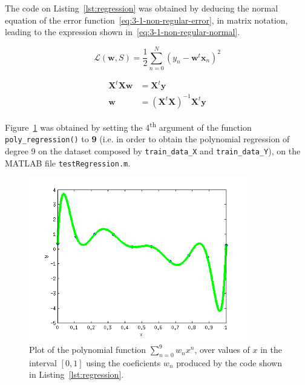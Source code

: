 \documentclass[paper=a4, fontsize=11pt]{scrartcl} %
\numberwithin{equation}{section} %
\numberwithin{figure}{section} %
\numberwithin{table}{section} %
\newcommand{\vertbreak}{\vspace{1.75 mm}}
\begin{document}
The code on Listing~\ref{lst:regression} was obtained by deducing the normal equation 
of the error function~\ref{eq:3-1-non-regular-error}, in matrix notation, leading 
to the expression shown in~\ref{eq:3-1-non-regular-normal}.\vertbreak

\begin{equation}
    \mathcal{L}(\textbf{w},S) = \frac{1}{2}\sum_{n=0}^{N}(y_n - \textbf{w}^{t}\textbf{x}_n)^{2}
    \label{eq:3-1-non-regular-error}
\end{equation}

\begin{equation}
\begin{split}
    \textbf{X}^{t}\textbf{X}\textbf{w} &= \textbf{X}^{t}\textbf{y}\\
    \textbf{w} &= \left(\textbf{X}^{t}\textbf{X}\right)^{-1}\textbf{X}^{t}\textbf{y}
    \label{eq:3-1-non-regular-normal}
\end{split}
\end{equation}

Figure~\ref{fig:3-1} was obtained by setting the 4\textsuperscript{th} argument 
of the function \verb?poly_regression()? to \textbf{9} (i.e. in order to obtain 
the polynomial regression of degree 9 on the dataset composed by 
\verb?train_data_X? and \verb?train_data_Y?), on the MATLAB 
file \verb?testRegression.m?.

\begin{figure}[H]

    \centering
    \includegraphics[width=0.85\textwidth]{figures/3-1.png}
    \caption{Plot of the polynomial function $\sum_{n=0}^{9} w_n x^{n}$, over values of $x$ in the 
            interval $[0,1]$  using the coeficients $w_n$ produced by the code 
            shown in Listing~\ref{lst:regression}.}
    \label{fig:3-1}

\end{figure}
\end{document}
